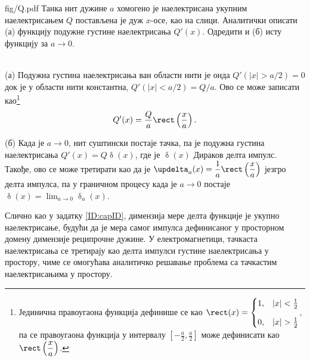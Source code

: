 \noindent
\begin{slikaDesno}[0.833]{fig/Q.pdf}\noindent
\PID 
Танка нит дужине $a$ хомогено је наелектрисана укупним 
наелектрисањем $Q$ постављена је дуж $x$-осе, као на слици. 
Аналитички описати (а) функцију подужне густине 
наелектрисања $Q'(x)$. Одредити и (б) исту функцију за
$a \to 0$. 
\end{slikaDesno} \\[2mm]

\RESENJE 
(а) Подужна густина наелектрисања ван области нити је онда 
    $Q'(|x| > a/2) = 0$ док је у области нити константна, $Q'(|x| < a/2) = Q/a$.
    Ово се може записати као\footnote{ Јединична правоугаона функција дефинише се као \vspace*{1mm}
    $\rect(x) = \begin{cases}
        1, & |x| < \frac12 \\[3mm]
        0, & |x| > \frac12 \end{cases}$, 
        па се правоугаона функција у интервалу $\displaystyle \left[-\frac{a}{2}, \frac{a}{2}\right]$ може дефинисати као
        $\rect\left(\dfrac{x}{a}\right)$.}
    \begin{equation}
        Q'(x) = \dfrac{Q}{a} \rect\left(\dfrac{x}{a}\right).
    \end{equation}
    
(б) Када је $a \to 0$, нит суштински постаје тачка, па је подужна густина наелектрисања
    $Q'(x) = Q \updelta(x)$, где је $\updelta(x)$ Дираков делта импулс. Такође, ово се може третирати као да је 
    $\updelta_a(x) = \dfrac{1}{a} \rect\left(\dfrac{x}{a}\right)$ језгро делта импулса, па у граничном процесу 
    \vspace*{1mm}
    када је $a \to 0$ постаје $\updelta(x) = \lim_{a \to 0} \updelta_a(x)$.

Слично као у задатку \ref{ID:capID}, димензија мере делта функције је укупно наелектрисање, будући да је мера
самог импулса дефинисаног у просторном домену димензије реципрочне дужине. 
У електромагнетици, тачкаста наелектрисања се третирају као делта импулси густине наелектрисања у простору, чиме се 
    омогућава аналитичко решавање проблема са тачкастим наелектрисањима у простору.